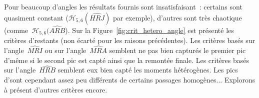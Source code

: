 \documentclass[main.tex]{subfiles}
\begin{document}
Pour beaucoup d'angles les résultats fournis sont insatisfaisant~: certains sont quasiment constant ($\mathcal{H}_{5,6}(\widehat{HRJ})$ par exemple), d'autres sont très chaotique (comme~$\mathcal{H}_{5,6}(\widehat{ARB}$). Sur la Figure~\ref{fig:crit_hetero_angle} est présenté les critères d'\hetero restants (\ie non écarté pour les raisons précédentes). 
Les critères basés sur l'angle~$\widehat{MRI}$ ou sur l'angle~$\widehat{MRA}$ semblent ne pas bien capturés le premier pic d'\hetero même si le second pic est capté ainsi que la remontée finale. Les critères basés sur l'angle~$\widehat{HRB}$ semblent eux bien capté les moments hétérogènes. Les pics d'\hetero sont cependant %
assez peu différents de certains passages homogènes... 
Explorons à présent d'autres critères encore.
\end{document}
